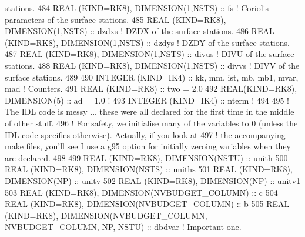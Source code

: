 \begin{DoxyCode}
{       stations.}
484 \textcolor{keywordtype}{REAL (KIND=RK8)}, \textcolor{keywordtype}{DIMENSION(1,NSTS)}                  :: fs               \textcolor{comment}{! Coriolis parameters of the
       surface stations.}
485 \textcolor{keywordtype}{REAL (KIND=RK8)}, \textcolor{keywordtype}{DIMENSION(1,NSTS)}                  :: dzdxs            \textcolor{comment}{! DZDX of the surface stations.}
486 \textcolor{keywordtype}{REAL (KIND=RK8)}, \textcolor{keywordtype}{DIMENSION(1,NSTS)}                  :: dzdys            \textcolor{comment}{! DZDY of the surface stations.}
487 \textcolor{keywordtype}{REAL (KIND=RK8)}, \textcolor{keywordtype}{DIMENSION(1,NSTS)}                  :: divus            \textcolor{comment}{! DIVU of the surface stations.}
488 \textcolor{keywordtype}{REAL (KIND=RK8)}, \textcolor{keywordtype}{DIMENSION(1,NSTS)}                  :: divvs            \textcolor{comment}{! DIVV of the surface stations.}
489 
490 \textcolor{keywordtype}{INTEGER (KIND=IK4)}                                  :: kk, mm, ist, mb, mb1, mvar, mad   \textcolor{comment}{! Counters.}
491 \textcolor{keywordtype}{REAL (KIND=RK8)}                                     :: two      = 2.0
492 \textcolor{keywordtype}{REAL(KIND=RK8)}, \textcolor{keywordtype}{DIMENSION(5)}                        :: ad       = 1.0   \textcolor{comment}{!}
493 \textcolor{keywordtype}{INTEGER (KIND=IK4)}                                  :: nterm            \textcolor{comment}{!}
494 
495 \textcolor{comment}{! The IDL code is messy ... these were all declared for the first time in the middle of other stuff.}
496 \textcolor{comment}{! For safety, we initialise many of the variables to 0 (unless the IDL code specifies otherwise). Actually,
       if you look at}
497 \textcolor{comment}{! the accompanying make files, you'll see I use a g95 option for initially zeroing variables when they are
       declared.}
498 
499 \textcolor{keywordtype}{REAL (KIND=RK8)}, \textcolor{keywordtype}{DIMENSION(NSTU)}                    :: unith
500 \textcolor{keywordtype}{REAL (KIND=RK8)}, \textcolor{keywordtype}{DIMENSION(NSTS)}                    :: uniths
501 \textcolor{keywordtype}{REAL (KIND=RK8)}, \textcolor{keywordtype}{DIMENSION(NP)}                      :: unitv
502 \textcolor{keywordtype}{REAL (KIND=RK8)}, \textcolor{keywordtype}{DIMENSION(NP)}                      :: unitv1
503 \textcolor{keywordtype}{REAL (KIND=RK8)}, \textcolor{keywordtype}{DIMENSION(NVBUDGET\_COLUMN)}         :: c
504 \textcolor{keywordtype}{REAL (KIND=RK8)}, \textcolor{keywordtype}{DIMENSION(NVBUDGET\_COLUMN)}         :: b
505 \textcolor{keywordtype}{REAL (KIND=RK8)}, \textcolor{keywordtype}{DIMENSION(NVBUDGET\_COLUMN, NVBUDGET\_COLUMN, NP, NSTU)}    :: dbdvar   \textcolor{comment}{! Important one.}

\end{DoxyCode}

